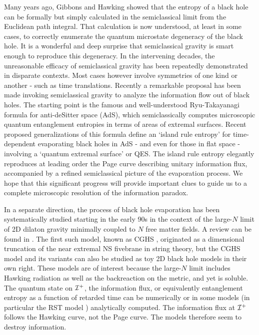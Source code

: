 \documentclass[12pt,oneside,letterpaper]{article}
\numberwithin{equation}{section}
\begin{document}
Many years ago, Gibbons and Hawking \cite{Gibbons:1976ue} showed that the entropy of a black hole can be formally but simply calculated
in the semiclassical limit from the Euclidean path integral. That calculation is now understood, at least in some cases, to correctly enumerate the quantum microstate degeneracy of the black hole. It is a wonderful and deep surprise that semiclassical gravity is smart enough to reproduce this degeneracy. In the intervening decades, the unreasonable efficacy of semiclassical gravity has been repeatedly demonstrated in disparate contexts. Most cases however involve symmetries of one kind or another - such as time translations. Recently  \cite{Penington:2019npb,Almheiri:2019psf,Almheiri:2019hni,Almheiri:2019qdq,Penington:2019kki}
a remarkable proposal has been made invoking semiclassical gravity to analyze the information flow out of black holes. The starting point is the famous and well-understood Ryu-Takayanagi formula \cite{Ryu:2006bv} for anti-deSitter space (AdS),
which semiclassically computes microscopic  quantum entanglement entropies in terms of areas of extremal surfaces. 
Recent proposed generalizations of this formula define an `island rule  entropy' for  time-dependent evaporating black holes in AdS  - and even for those in flat space - involving  a `quantum extremal surface' or QES\cite{Faulkner:2013ana,Hubeny:2007xt,Engelhardt:2014gca}.  The island rule  entropy elegantly reproduces at leading order the Page curve describing unitary information flux, accompanied by a  refined semiclassical picture of the evaporation process.  We hope that this significant progress will provide  important clues to guide us to  a complete microscopic resolution of the information paradox. 

In a separate direction, the process of black hole evaporation has been systematically  studied starting in the early 90s in the context of  the large-$N$ limit of 2D dilaton gravity minimally coupled to $N$ free matter fields. A review can be found in \cite{Strominger:1994tn}. The first such model, known as CGHS \cite{Callan:1992rs},  originated as a dimensional truncation of the near extremal NS fivebrane in string theory, but the CGHS model and its  variants \cite{Bilal:1992kv,Russo:1992ax,Giddings:1992ae,deAlwis:1992hv}  can also be studied as toy 2D black hole models in their own right. These models are of interest because the  large-$N$ limit includes Hawking radiation as well as the backreaction on the metric, and yet is soluble. The quantum state on ${\cal I}^+$, the information flux, or equivalently entanglement entropy as a function of retarded time can be numerically or in some models 
(in particular the RST model \cite{Russo:1992ax}) analytically computed.  The information flux at ${\cal I}^+$ follows the Hawking curve, not the Page curve. The models therefore seem to destroy information.
\end{document}
